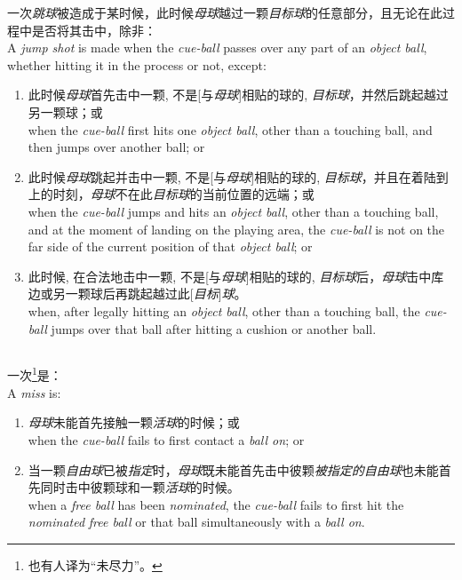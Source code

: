 \noindent 一次\textit{跳球}被造成于某时候，此时候\textit{母球}越过一颗\textit{目标球}的任意部分，且无论在此过程中是否将其击中，除非：\\
A \textit{jump shot} is made when the \textit{cue-ball} passes over any part of an \textit{object ball}, whether hitting it in the process or not, except:
\begin{enumerate}[label=(\alph*)]
    \item 此时候\textit{母球}首先击中一颗, 不是[与\textit{母球}]相贴的球的, \textit{目标球}，并然后跳起越过另一颗球；或\\
    when the \textit{cue-ball} first hits one \textit{object ball}, other than a touching ball, and then jumps over another ball; or
    \item 此时候\textit{母球}跳起并击中一颗, 不是[与\textit{母球}]相贴的球的, \textit{目标球}，并且在着陆到\playingarea{}上的时刻，\textit{母球}不在此\textit{目标球}的当前位置的远端；或\\
    when the \textit{cue-ball} jumps and hits an \textit{object ball}, other than a touching ball, and at the moment of landing on the playing area, the \textit{cue-ball} is not on the far side of the current position of that \textit{object ball}; or
    \item 此时候, 在合法地击中一颗, 不是[与\textit{母球}]相贴的球的, \textit{目标球}后，\textit{母球}击中库边或另一颗球后再跳起越过此[\textit{目标}]\textit{球}。\\
    when, after legally hitting an \textit{object ball}, other than a touching ball, the \textit{cue-ball} jumps over that ball after hitting a cushion or another ball.
\end{enumerate}

\subsection{\miss{}}

\noindent 一次\textit{\miss{}}\footnote{也有人译为“未尽力”。}是：\\
A \textit{miss} is:
\begin{enumerate}[label=(\alph*)]
    \item \textit{母球}未能首先接触一颗\textit{活球}的时候；或\\
    when the \textit{cue-ball} fails to first contact a \textit{ball on}; or
    \item 当一颗\textit{自由球}已被\textit{指定}时，\textit{母球}既未能首先击中彼颗\textit{被指定的}\textit{自由球}也未能首先同时击中彼颗球和一颗\textit{活球}的时候。\\
    when a \textit{free ball} has been \textit{nominated}, the \textit{cue-ball} fails to first hit the \textit{nominated} \textit{free ball} or that ball simultaneously with a \textit{ball on}.
\end{enumerate}


